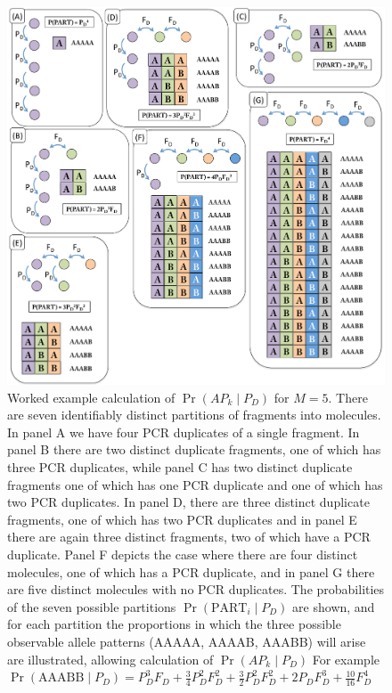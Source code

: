 \documentclass{article}
\begin{document}
\begin{figure}[hp!]
\begin{center}
\includegraphics[width=\textwidth]{M5figureexample.pdf}
\end{center}
\caption{Worked example calculation of $\Pr(AP_k \mid P_D)$ for $M = 5$. There are seven identifiably distinct partitions of fragments into molecules. In panel A we have four PCR duplicates of a single fragment. In panel B there are two distinct duplicate fragments, one of which has three PCR duplicates, while panel C has two distinct duplicate fragments one of which has one PCR duplicate and one of which has two PCR duplicates. In panel D, there are three distinct duplicate fragments, one of which has two PCR duplicates and in panel E there are again three distinct fragments, two of which have a PCR duplicate. Panel F depicts the case where there are four distinct molecules, one of which has a PCR duplicate, and in panel G there are five distinct molecules with no PCR duplicates. The probabilities of the seven possible partitions $\Pr(\text{PART}_i \mid P_D)$ are shown, and for each partition the proportions in which the three possible observable allele patterns (AAAAA, AAAAB, AAABB) will arise are illustrated, allowing calculation of $\Pr(AP_k \mid P_D)$  For example $\Pr(\text{AAABB} \mid P_D) = P_D^3F_D + \frac{3}{4}P_D^2F_D^2
+ \frac{3}{2}P_D^2F_D^2 + 2P_DF_D^3 + \frac{10}{16}F_D^4$
}
\label{M5example}
\end{figure}
\end{document}
